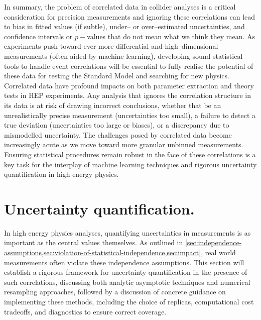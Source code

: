     In summary, the problem of correlated data in collider analyses is a critical consideration for precision measurements and ignoring these correlations can lead to bias in fitted values (if subtle), under-- or over--estimated uncertainties, and confidence intervals or $p-$values that do not mean what we think they mean.
    As experiments push toward ever more differential and high--dimensional measurements (often aided by machine learning), developing sound statistical tools to handle event correlations will be essential to fully realise the potential of these data for testing the Standard Model and searching for new physics.
    Correlated data have profound impacts on both parameter extraction and theory tests in HEP experiments.
    Any analysis that ignores the correlation structure in its data is at risk of drawing incorrect conclusions, whether that be an unrealistically precise measurement (uncertainties too small), a failure to detect a true deviation (uncertainties too large or biases), or a discrepancy due to mismodelled uncertainty.
    The challenges posed by correlated data become increasingly acute as we move toward more granular unbinned measurements.
    Ensuring statistical procedures remain robust in the face of these correlations is a key task for the interplay of machine learning techniques and rigorous uncertainty quantification in high energy physics.
    
\section{Uncertainty quantification.}
    In high energy physics analyses, quantifying uncertainties in measurements is as important as the central values themselves.
    As outlined in \cref{sec:independence-assumptions,sec:violation-of-statistical-independence,sec:impact}, real world measurements often violate these independence assumptions.
    This section will establish a rigorous framework for uncertainty quantification in the presence of such correlations, discussing both analytic asymptotic techniques and numerical resampling approaches, followed by a discussion of concrete guidance on implementing these methods, including the choice of replicas, computational cost tradeoffs, and diagnostics to ensure correct coverage.
    
